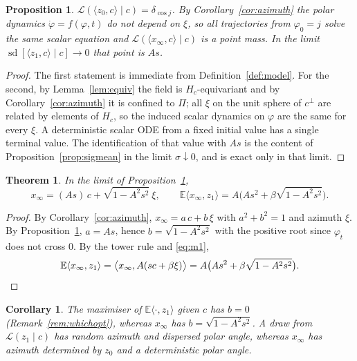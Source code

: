\documentclass[11pt]{article}
\newtheorem{proposition}[lemma]{Proposition}
\newtheorem{theorem}[lemma]{Theorem}
\newtheorem{corollary}[lemma]{Corollary}
\theoremstyle{definition}
\theoremstyle{remark}
\DeclareMathOperator{\sd}{sd}
\newcommand{\E}{\mathbb{E}}
\newcommand{\law}{\mathcal{L}}
\begin{document}
\begin{proposition}\label{prop:polarland}
$\law(\langle z_0,c\rangle\mid c)=\delta_{\cos j}$. By Corollary~\ref{cor:azimuth} the polar
dynamics $\dot\varphi=f(\varphi,t)$ do not depend on $\xi$, so all trajectories from
$\varphi_0=j$ solve the same scalar equation and $\law(\langle x_\infty,c\rangle\mid c)$ is a point
mass. In the limit $\sd[\langle z_1,c\rangle\mid c]\to0$ that point is $As$.
\end{proposition}

\begin{proof}
The first statement is immediate from Definition~\ref{def:model}. For the second, by
Lemma~\ref{lem:equiv} the field is $H_c$-equivariant and by Corollary~\ref{cor:azimuth} it is
confined to $\Pi$; all $\xi$ on the unit sphere of $c^{\perp}$ are related by elements of $H_c$,
so the induced scalar dynamics on $\varphi$ are the same for every $\xi$. A deterministic scalar
ODE from a fixed initial value has a single terminal value. The identification of that value with
$As$ is the content of Proposition~\ref{prop:sigmean} in the limit $\sigma\downarrow0$, and is
exact only in that limit.
\end{proof}

\begin{theorem}\label{thm:land}
In the limit of Proposition~\ref{prop:polarland},
\[
x_\infty=(As)\,c+\sqrt{1-A^{2}s^{2}}\ \xi,
\qquad
\E\langle x_\infty,z_1\rangle=A\Big(As^{2}+\beta\sqrt{1-A^{2}s^{2}}\Big).
\]
\end{theorem}

\begin{proof}
By Corollary~\ref{cor:azimuth}, $x_\infty=a\,c+b\,\xi$ with $a^{2}+b^{2}=1$ and azimuth $\xi$. By
Proposition~\ref{prop:polarland}, $a=As$, hence $b=\sqrt{1-A^{2}s^{2}}$ with the positive root
since $\varphi_t$ does not cross $0$. By the tower rule and \eqref{eq:m1},
\[
\E\langle x_\infty,z_1\rangle=\big\langle x_\infty,A(sc+\beta\xi)\big\rangle
=A\big(As^{2}+\beta\sqrt{1-A^{2}s^{2}}\big). \qedhere
\]
\end{proof}

\begin{corollary}\label{cor:neither}
The maximiser of $\E\langle\cdot,z_1\rangle$ given $c$ has $b=0$ (Remark~\ref{rem:whichopt}),
whereas $x_\infty$ has $b=\sqrt{1-A^{2}s^{2}}$. A draw from $\law(z_1\mid c)$ has random azimuth
and dispersed polar angle, whereas $x_\infty$ has azimuth determined by $z_0$ and a deterministic
polar angle.
\end{corollary}
\end{document}
